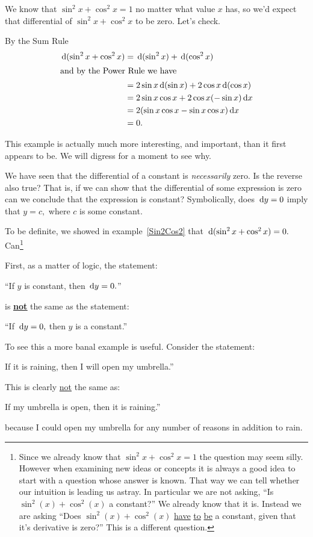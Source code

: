\begin{myexample}{}
  \label{Sin2Cos2}
  We know that \(\sin^2x+\cos^2x=1\) no matter what value $x$ has, so
  we'd expect that differential of \(\sin^2x+\cos^2x\) to be
  zero. Let's check.

  By the Sum Rule
  \begin{align*}
    \thinspace{\rm d}(\sin^2x+\cos^2x) &= \thinspace{\rm d}(\sin^2x) + \thinspace{\rm d}(\cos^2x)\\
\intertext{and by the Power Rule we have}
    &= 2\sin x\thinspace{\rm d}(\sin x) + 2\cos x\thinspace{\rm d}(\cos x)\\
    &= 2\sin x\cos x + 2\cos x(-\sin x)\thinspace{\rm d}x\\
    &= 2(\sin x\cos x - \sin x\cos x)\thinspace{\rm d}x\\
    &= 0.
  \end{align*}
\end{myexample}

This example is actually much more interesting, and important, than it
first appears to be. We will digress for a moment to see why.

We have seen that the differential
  of a constant is \emph{necessarily} zero. Is the reverse also true?
That is, if we can show that the differential of some expression
is zero can we conclude that the expression is constant? Symbolically,
does $\thinspace{\rm d}y = 0$ imply that $y=c,$ where $c$ is some constant. 

To be definite, we showed in example~\ref{Sin2Cos2} that
\(\thinspace{\rm d}(\sin^2x+\cos^2x)=0.\) Can\footnote{
Since we already know that \(\sin^2x+\cos^2x=1\)
the question may seem silly. However when examining new ideas or
concepts it is always a good idea to start with a question whose
answer is known. That way we can tell whether our intuition is leading
us astray. In particular we are not asking, ``Is $\sin^2(x) +
\cos^2(x)$ a constant?'' We already know that it is. Instead we are
asking ``Does  $\sin^2(x) +
\cos^2(x)$ \underline{have} \underline{to} \underline{be} a constant,
given that it's derivative is zero?'' This is a different question.}

First, as a matter of logic, the statement:\\
\centerline{``If $y$ is constant, then $\thinspace{\rm d}y=0.$''}
is \underline{\underline{\underline{\bf \Large not}}} the same as the
statement:\\
\centerline{``If $\thinspace{\rm d}y=0,$ then $y$ is a constant.''}
To see this a more banal example is useful. Consider the statement:\\
\centerline{If it is raining, then I will open my umbrella.''}
This is clearly \underline{not} the same as:\\
\centerline{If my umbrella is open, then it is raining.''}
because I could open my umbrella for any number of reasons in addition
to rain.

